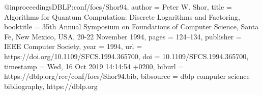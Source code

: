 @inproceedings{DBLP:conf/focs/Shor94,
  author    = {Peter W. Shor},
  title     = {Algorithms for Quantum Computation: Discrete Logarithms and Factoring},
  booktitle = {35th Annual Symposium on Foundations of Computer Science, Santa Fe,
               New Mexico, USA, 20-22 November 1994},
  pages     = {124--134},
  publisher = {{IEEE} Computer Society},
  year      = {1994},
  url       = {https://doi.org/10.1109/SFCS.1994.365700},
  doi       = {10.1109/SFCS.1994.365700},
  timestamp = {Wed, 16 Oct 2019 14:14:54 +0200},
  biburl    = {https://dblp.org/rec/conf/focs/Shor94.bib},
  bibsource = {dblp computer science bibliography, https://dblp.org}
}